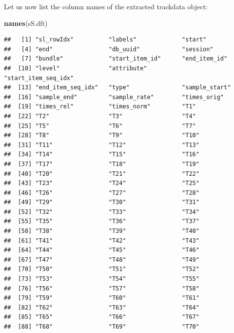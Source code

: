 \documentclass[]{book}
\newenvironment{Shaded}{\begin{snugshade}}{\end{snugshade}}
\newcommand{\KeywordTok}[1]{\textcolor[rgb]{0.13,0.29,0.53}{\textbf{#1}}}
\newcommand{\NormalTok}[1]{#1}
\begin{document}
Let us now list the column names of the extracted trackdata object:

\begin{Shaded}
\begin{Highlighting}[]
\KeywordTok{names}\NormalTok{(sS.dft)}
\end{Highlighting}
\end{Shaded}

\begin{verbatim}
##   [1] "sl_rowIdx"          "labels"             "start"             
##   [4] "end"                "db_uuid"            "session"           
##   [7] "bundle"             "start_item_id"      "end_item_id"       
##  [10] "level"              "attribute"          "start_item_seq_idx"
##  [13] "end_item_seq_idx"   "type"               "sample_start"      
##  [16] "sample_end"         "sample_rate"        "times_orig"        
##  [19] "times_rel"          "times_norm"         "T1"                
##  [22] "T2"                 "T3"                 "T4"                
##  [25] "T5"                 "T6"                 "T7"                
##  [28] "T8"                 "T9"                 "T10"               
##  [31] "T11"                "T12"                "T13"               
##  [34] "T14"                "T15"                "T16"               
##  [37] "T17"                "T18"                "T19"               
##  [40] "T20"                "T21"                "T22"               
##  [43] "T23"                "T24"                "T25"               
##  [46] "T26"                "T27"                "T28"               
##  [49] "T29"                "T30"                "T31"               
##  [52] "T32"                "T33"                "T34"               
##  [55] "T35"                "T36"                "T37"               
##  [58] "T38"                "T39"                "T40"               
##  [61] "T41"                "T42"                "T43"               
##  [64] "T44"                "T45"                "T46"               
##  [67] "T47"                "T48"                "T49"               
##  [70] "T50"                "T51"                "T52"               
##  [73] "T53"                "T54"                "T55"               
##  [76] "T56"                "T57"                "T58"               
##  [79] "T59"                "T60"                "T61"               
##  [82] "T62"                "T63"                "T64"               
##  [85] "T65"                "T66"                "T67"               
##  [88] "T68"                "T69"                "T70"               

\end{verbatim}
\end{document}
